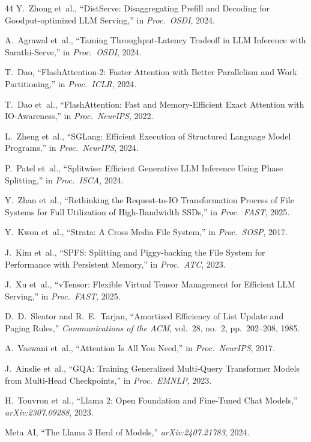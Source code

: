 \documentclass[conference]{IEEEtran}
\begin{document}
\begin{thebibliography}{44}
 Y.~Zhong et~al., ``DistServe: Disaggregating Prefill and Decoding for Goodput-optimized LLM Serving,'' in \textit{Proc.\ OSDI}, 2024.

 A.~Agrawal et~al., ``Taming Throughput-Latency Tradeoff in LLM Inference with Sarathi-Serve,'' in \textit{Proc.\ OSDI}, 2024.

 T.~Dao, ``FlashAttention-2: Faster Attention with Better Parallelism and Work Partitioning,'' in \textit{Proc.\ ICLR}, 2024.

 T.~Dao et~al., ``FlashAttention: Fast and Memory-Efficient Exact Attention with IO-Awareness,'' in \textit{Proc.\ NeurIPS}, 2022.

 L.~Zheng et~al., ``SGLang: Efficient Execution of Structured Language Model Programs,'' in \textit{Proc.\ NeurIPS}, 2024.

 P.~Patel et~al., ``Splitwise: Efficient Generative LLM Inference Using Phase Splitting,'' in \textit{Proc.\ ISCA}, 2024.

 Y.~Zhan et~al., ``Rethinking the Request-to-IO Transformation Process of File Systems for Full Utilization of High-Bandwidth SSDs,'' in \textit{Proc.\ FAST}, 2025.

 Y.~Kwon et~al., ``Strata: A Cross Media File System,'' in \textit{Proc.\ SOSP}, 2017.

 J.~Kim et~al., ``SPFS: Splitting and Piggy-backing the File System for Performance with Persistent Memory,'' in \textit{Proc.\ ATC}, 2023.

 J.~Xu et~al., ``vTensor: Flexible Virtual Tensor Management for Efficient LLM Serving,'' in \textit{Proc.\ FAST}, 2025.

 D.~D.~Sleator and R.~E.~Tarjan, ``Amortized Efficiency of List Update and Paging Rules,'' \textit{Communications of the ACM}, vol.~28, no.~2, pp.~202--208, 1985.

 A.~Vaswani et~al., ``Attention Is All You Need,'' in \textit{Proc.\ NeurIPS}, 2017.

 J.~Ainslie et~al., ``GQA: Training Generalized Multi-Query Transformer Models from Multi-Head Checkpoints,'' in \textit{Proc.\ EMNLP}, 2023.

 H.~Touvron et~al., ``Llama 2: Open Foundation and Fine-Tuned Chat Models,'' \textit{arXiv:2307.09288}, 2023.

 Meta AI, ``The Llama 3 Herd of Models,'' \textit{arXiv:2407.21783}, 2024.


\end{thebibliography}
\end{document}
